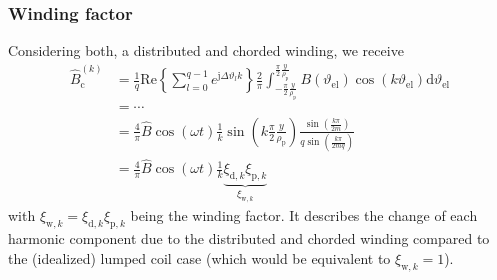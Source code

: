 \begin{frame}
	\frametitle{Winding factor}
    Considering both, a distributed and chorded winding, we receive
    \begin{equation}
        \begin{split}
            \hat{B}_{\mathrm{c}}^{(k)} &= \frac{1}{q}\mathrm{Re}\left\{\sum_{l=0}^{q-1} e^{\mathrm{j} \Delta\vartheta_l k}\right\}  \frac{2}{\pi}\int_{-\frac{\pi}{2}\frac{y}{\rho_\mathrm{p}}}^{\frac{\pi}{2}\frac{y}{\rho_\mathrm{p}}} B(\vartheta_\mathrm{el}) \cos(k \vartheta_\mathrm{el}) \mathrm{d}\vartheta_\mathrm{el}\\
            &=\cdots\\
            &= \frac{4}{\pi}\hat{B}\cos(\omega t)\frac{1}{k} \sin\left(k\frac{\pi}{2}\frac{y}{\rho_\mathrm{p}}\right)  \frac{\sin\left(\frac{k \pi}{2 m}\right)}{q\sin\left(\frac{k \pi}{2 m q}\right)}\\
            &= \frac{4}{\pi}\hat{B}\cos(\omega t)\frac{1}{k} \underbrace{\xi_{\mathrm{d},k} \xi_{\mathrm{p},k}}_{\xi_{\mathrm{w},k}}
            \end{split}
        \label{eq:Winding_factor_fourier_coefficients} 
    \end{equation}
    with $\xi_{\mathrm{w},k} = \xi_{\mathrm{d},k} \xi_{\mathrm{p},k}$ being the winding factor. It describes the change of each harmonic component due to the distributed and chorded winding compared to the (idealized) lumped coil case (which would be equivalent to $\xi_{\mathrm{w},k}=1$).
\end{frame}

